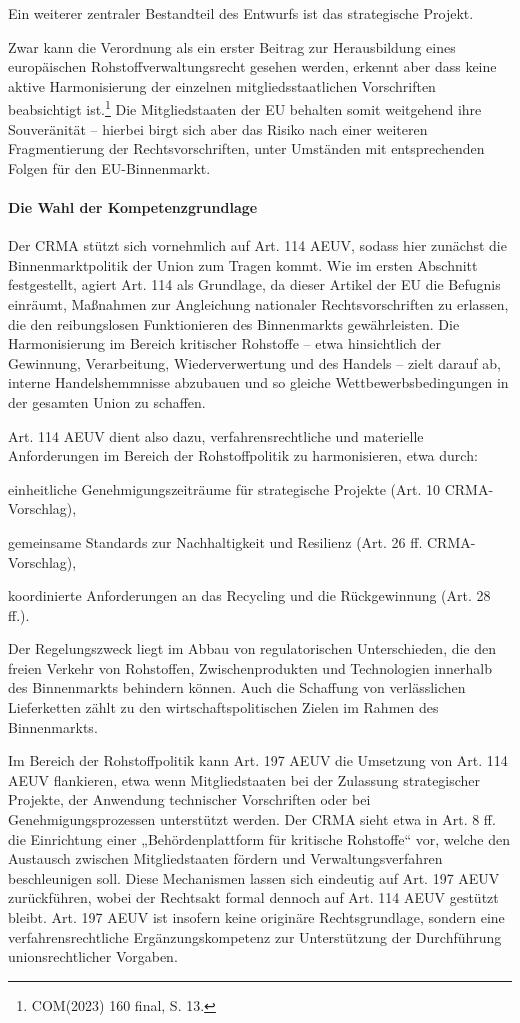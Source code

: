\documentclass[12pt,a4paper,oneside]{book} %
\begin{document}
Ein weiterer zentraler Bestandteil des Entwurfs ist das \glqq strategische Projekt\grqq. %

Zwar kann die Verordnung als ein erster Beitrag zur Herausbildung eines europäischen Rohstoffverwaltungsrecht gesehen werden, erkennt aber dass keine aktive Harmonisierung der einzelnen mitgliedsstaatlichen Vorschriften beabsichtigt ist.\footnote{COM(2023) 160 final, S. 13.} Die Mitgliedstaaten der EU behalten somit weitgehend ihre Souveränität -- hierbei birgt sich aber das Risiko nach einer weiteren Fragmentierung der Rechtsvorschriften, unter Umständen mit entsprechenden Folgen für den EU-Binnenmarkt.


\paragraph{Die Wahl der Kompetenzgrundlage}
Der CRMA stützt sich vornehmlich auf Art. 114 AEUV, sodass hier zunächst die Binnenmarktpolitik der Union zum Tragen kommt. Wie im ersten Abschnitt festgestellt, agiert Art. 114 als Grundlage, da dieser Artikel der EU die Befugnis einräumt, Maßnahmen zur Angleichung nationaler Rechtsvorschriften zu erlassen, die den reibungslosen Funktionieren des Binnenmarkts gewährleisten. Die Harmonisierung im Bereich kritischer Rohstoffe – etwa hinsichtlich der Gewinnung, Verarbeitung, Wiederverwertung und des Handels – zielt darauf ab, interne Handelshemmnisse abzubauen und so gleiche Wettbewerbsbedingungen in der gesamten Union zu schaffen.

Art. 114 AEUV dient also dazu, verfahrensrechtliche und materielle Anforderungen im Bereich der Rohstoffpolitik zu harmonisieren, etwa durch:

einheitliche Genehmigungszeiträume für strategische Projekte (Art. 10 CRMA-Vorschlag),

gemeinsame Standards zur Nachhaltigkeit und Resilienz (Art. 26 ff. CRMA-Vorschlag),

koordinierte Anforderungen an das Recycling und die Rückgewinnung (Art. 28 ff.).

Der Regelungszweck liegt im Abbau von regulatorischen Unterschieden, die den freien Verkehr von Rohstoffen, Zwischenprodukten und Technologien innerhalb des Binnenmarkts behindern können. Auch die Schaffung von verlässlichen Lieferketten zählt zu den wirtschaftspolitischen Zielen im Rahmen des Binnenmarkts.

Im Bereich der Rohstoffpolitik kann Art. 197 AEUV die Umsetzung von Art. 114 AEUV flankieren, etwa wenn Mitgliedstaaten bei der Zulassung strategischer Projekte, der Anwendung technischer Vorschriften oder bei Genehmigungsprozessen unterstützt werden. Der CRMA sieht etwa in Art. 8 ff. die Einrichtung einer „Behördenplattform für kritische Rohstoffe“ vor, welche den Austausch zwischen Mitgliedstaaten fördern und Verwaltungsverfahren beschleunigen soll.
Diese Mechanismen lassen sich eindeutig auf Art. 197 AEUV zurückführen, wobei der Rechtsakt formal dennoch auf Art. 114 AEUV gestützt bleibt. Art. 197 AEUV ist insofern keine originäre Rechtsgrundlage, sondern eine verfahrensrechtliche Ergänzungskompetenz zur Unterstützung der Durchführung unionsrechtlicher Vorgaben.
\end{document}
